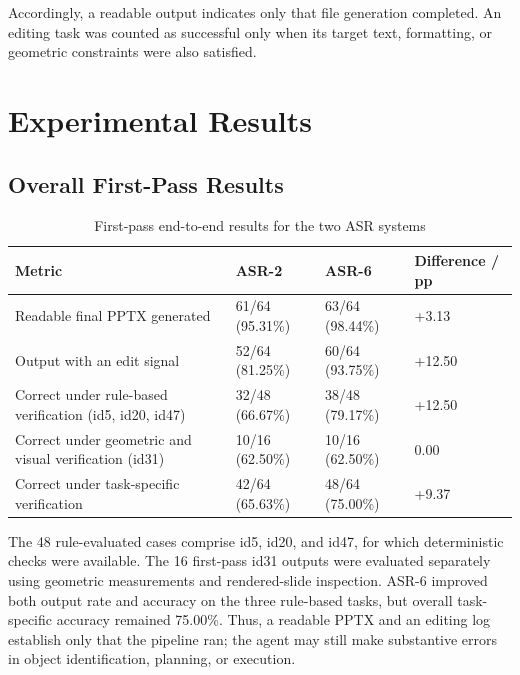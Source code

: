 \documentclass[11pt,a4paper,UTF8,fontset=fandol]{ctexart}
\begin{document}
Accordingly, a readable output indicates only that file generation completed. An editing task was counted as successful only when its target text, formatting, or geometric constraints were also satisfied.

\section{Experimental Results}

\subsection{Overall First-Pass Results}

\begin{table}[H]
\centering
\caption{First-pass end-to-end results for the two ASR systems}
\small
\begin{tabularx}{\textwidth}{Y C{3.1cm} C{3.1cm} C{2.2cm}}
\toprule
Metric & ASR-2 & ASR-6 & Difference / pp \\
\midrule
Readable final PPTX generated & 61/64 (95.31\%) & 63/64 (98.44\%) & +3.13 \\
Output with an edit signal & 52/64 (81.25\%) & 60/64 (93.75\%) & +12.50 \\
Correct under rule-based verification (id5, id20, id47) & 32/48 (66.67\%) & 38/48 (79.17\%) & +12.50 \\
Correct under geometric and visual verification (id31) & 10/16 (62.50\%) & 10/16 (62.50\%) & 0.00 \\
Correct under task-specific verification & 42/64 (65.63\%) & 48/64 (75.00\%) & +9.37 \\
\bottomrule
\end{tabularx}
\end{table}

The 48 rule-evaluated cases comprise id5, id20, and id47, for which deterministic checks were available. The 16 first-pass id31 outputs were evaluated separately using geometric measurements and rendered-slide inspection. ASR-6 improved both output rate and accuracy on the three rule-based tasks, but overall task-specific accuracy remained 75.00\%. Thus, a readable PPTX and an editing log establish only that the pipeline ran; the agent may still make substantive errors in object identification, planning, or execution.
\end{document}
